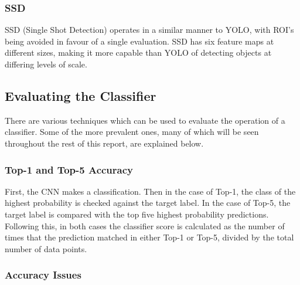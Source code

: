 \documentclass[12pt]{report}
\begin{document}
\subsubsection{SSD}
\begin{flushleft}
SSD (Single Shot Detection) operates in a similar manner to YOLO, with ROI's being avoided in favour of a single evaluation. SSD has six feature maps at different sizes, making it more capable than YOLO of detecting objects at differing levels of scale.
\end{flushleft}

\subsection{Evaluating the Classifier}
\begin{flushleft}
There are various techniques which can be used to evaluate the operation of a classifier. Some of the more prevalent ones, many of which will be seen throughout the rest of this report, are explained below.
\end{flushleft}

\subsubsection{Top-1 and Top-5 Accuracy}
\begin{flushleft}
First, the CNN makes a classification. Then in the case of Top-1, the class of the highest probability is checked against the target label. In the case of Top-5, the target label is compared with the top five highest probability predictions. Following this, in both cases the classifier score is calculated as the number of times that the prediction matched in either Top-1 or Top-5, divided by the total number of data points.
\end{flushleft}

\subsubsection{Accuracy Issues}
\end{document}
